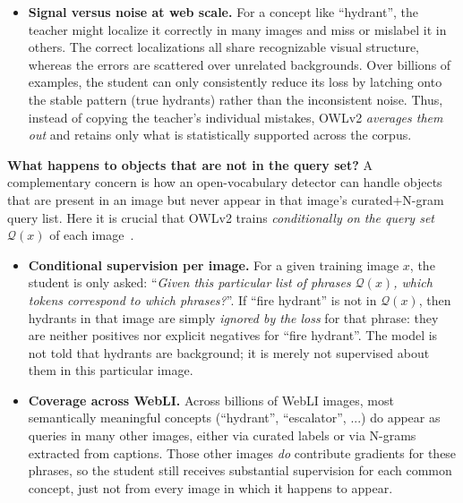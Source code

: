 \begin{enrichment}
\begin{enrichment}
\begin{enumerate}
\begin{itemize}
				\item \textbf{Signal versus noise at web scale.}
				For a concept like ``hydrant'', the teacher might localize it correctly in many images and miss or mislabel it in others.
				The correct localizations all share recognizable visual structure, whereas the errors are scattered over unrelated backgrounds.
				Over billions of examples, the student can only consistently reduce its loss by latching onto the stable pattern (true hydrants) rather than the inconsistent noise.
				Thus, instead of copying the teacher’s individual mistakes, OWLv2 \emph{averages them out} and retains only what is statistically supported across the corpus.
			\end{itemize}
			
			\medskip
			\noindent
			\textbf{What happens to objects that are not in the query set?}
			A complementary concern is how an open-vocabulary detector can handle objects that are present in an image but never appear in that image’s curated+N-gram query list.
			Here it is crucial that OWLv2 trains \emph{conditionally on the query set} $\mathcal{Q}(x)$ of each image~\cite{minderer2024_owlvitv2}.
			
			\begin{itemize}
				\item \textbf{Conditional supervision per image.}
				For a given training image $x$, the student is only asked: ``\emph{Given this particular list of phrases $\mathcal{Q}(x)$, which tokens correspond to which phrases?}''.
				If ``fire hydrant'' is not in $\mathcal{Q}(x)$, then hydrants in that image are simply \emph{ignored by the loss} for that phrase: they are neither positives nor explicit negatives for ``fire hydrant''.
				The model is not told that hydrants are background; it is merely not supervised about them in this particular image.
				
				\item \textbf{Coverage across WebLI.}
				Across billions of WebLI images, most semantically meaningful concepts (``hydrant'', ``escalator'', ...) do appear as queries in many other images, either via curated labels or via N-grams extracted from captions.
				Those other images \emph{do} contribute gradients for these phrases, so the student still receives substantial supervision for each common concept, just not from every image in which it happens to appear.
				
				\newpage
				

\end{itemize}
\end{enumerate}
\end{enrichment}
\end{enrichment}
